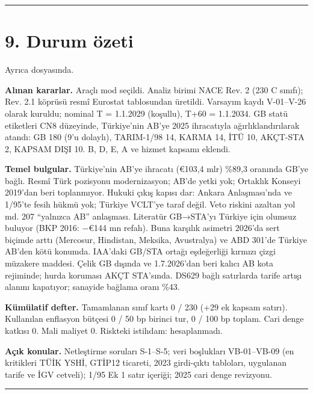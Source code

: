 \endgroup

\begin{center}\rule{0.5\linewidth}{0.5pt}\end{center}

\hypertarget{00_plan-9-durum-uxf6zeti}{%
\section{9. Durum özeti}\label{00_plan-9-durum-uxf6zeti}}

Ayrıca  dosyasında.

\textbf{Alınan kararlar.} Araçlı mod seçildi. Analiz birimi NACE Rev. 2 (230 C sınıfı); Rev. 2.1 köprüsü resmî Eurostat tablosundan üretildi. Varsayım kaydı V-01--V-26 olarak kuruldu; nominal T = 1.1.2029 (koşullu), T+60 = 1.1.2034. GB statü etiketleri CN8 düzeyinde, Türkiye'nin AB'ye 2025 ihracatıyla ağırlıklandırılarak atandı: GB 180 (9'u dolaylı), TARIM-1/98 14, KARMA 14, İTÜ 10, AKÇT-STA 2, KAPSAM DIŞI 10. B, D, E, A ve hizmet kapsamı eklendi.

\textbf{Temel bulgular.} Türkiye'nin AB'ye ihracatı (€103,4 mlr) \%89,3 oranında GB'ye bağlı. Resmî Türk pozisyonu modernizasyon; AB'de yetki yok; Ortaklık Konseyi 2019'dan beri toplanmıyor. Hukuki çıkış kapısı dar: Ankara Anlaşması'nda ve 1/95'te fesih hükmü yok; Türkiye VCLT'ye taraf değil. Veto riskini azaltan yol md. 207 ``yalnızca AB'' anlaşması. Literatür GB→STA'yı Türkiye için olumsuz buluyor (BKP 2016: −€144 mn refah). Buna karşılık asimetri 2026'da sert biçimde arttı (Mercosur, Hindistan, Meksika, Avustralya) ve ABD 301'de Türkiye AB'den kötü konumda. IAA'daki GB/STA ortağı eşdeğerliği kırmızı çizgi müzakere maddesi. Çelik GB dışında ve 1.7.2026'dan beri kalıcı AB kota rejiminde; hurda koruması AKÇT STA'sında. DS629 bağlı satırlarda tarife artışı alanını kapatıyor; sanayide bağlama oranı \%43.

\textbf{Kümülatif defter.} Tamamlanan sınıf kartı 0 / 230 (+29 ek kapsam satırı). Kullanılan enflasyon bütçesi 0 / 50 bp birinci tur, 0 / 100 bp toplam. Cari denge katkısı 0. Mali maliyet 0. Riskteki istihdam: hesaplanmadı.

\textbf{Açık konular.} Netleştirme soruları S-1--S-5; veri boşlukları VB-01--VB-09 (en kritikleri TÜİK YSHİ, GTİP12 ticareti, 2023 girdi-çıktı tabloları, uygulanan tarife ve İGV cetveli); 1/95 Ek 1 satır içeriği; 2025 cari denge revizyonu.

\begin{center}\rule{0.5\linewidth}{0.5pt}\end{center}


